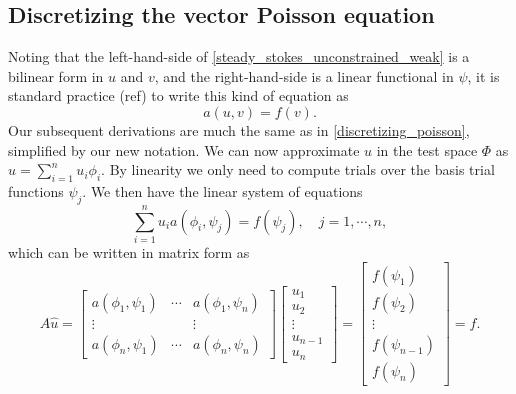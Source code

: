 \documentclass[11pt,a4paper]{memoir}
\begin{document}
\subsection{Discretizing the vector Poisson equation}\label{discretizing_vector_poisson}
Noting that the left-hand-side of \eqref{steady_stokes_unconstrained_weak} is a bilinear form in $u$ and $v$, and the right-hand-side
is a linear functional in $\psi$, it is standard practice (ref) to write this kind of equation as
\begin{equation}
    a(u, v) = f(v).
\end{equation}
Our subsequent derivations are much the same as in \ref{discretizing_poisson}, simplified by our new notation.
We can now approximate $u$ in the test space $\Phi$ as $\hat{u} = \sum_{i=1}^nu_i\phi_i$. By linearity we only need to compute
trials over the basis trial functions $\psi_j$.
We then have the linear system of equations
\begin{equation}\label{elliptic_bilinear_form}
    \sum_{i=1}^n u_i a\left(\phi_i, \psi_j\right) = f(\psi_j),\quad j=1,\cdots,n,
\end{equation}
which can be written in matrix form as
\begin{equation}\label{elliptic_bilinear_form_matrix}
    A\hat{u} = \begin{bmatrix}
            a(\phi_1, \psi_1) & \cdots & a(\phi_1, \psi_n) \\
            \vdots & & \vdots \\
            a(\phi_n, \psi_1) & \cdots & a(\phi_n, \psi_n)
            \end{bmatrix}
    \begin{bmatrix} u_1 \\ u_2 \\ \vdots \\ u_{n-1} \\ u_n \end{bmatrix}
    =
    \begin{bmatrix} f(\psi_1) \\ f(\psi_2) \\ \vdots \\ f(\psi_{n-1}) \\ f(\psi_{n}) \end{bmatrix}
    = \hat{f}.
\end{equation}
\end{document}
